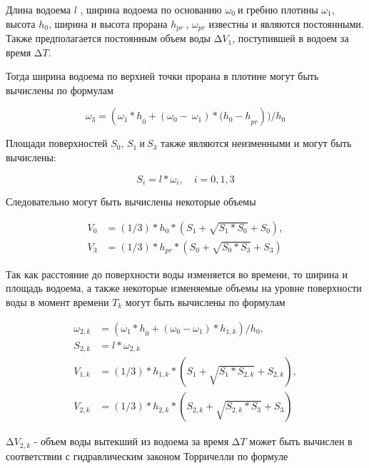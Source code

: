 \begin{multicols}{2}
Длина водоема \(l\) , ширина водоема по основанию \(\omega_{0}\ \)и
гребню плотины \(\omega_{1}\), высота \(h_{0}\), ширина и высота прорана
\(h_{pr}\ \), \(\omega_{pr}\) известны и являются постоянными. Также
предполагается постоянным объем воды \(\mathrm{\Delta}V_{1}\),
поступившей в водоем за время \(\mathrm{\Delta}T\).

Тогда ширина водоема по верхней точки прорана в плотине могут быть
вычислены по формулам

\begin{equation}
\omega_{3} = ({\omega_{1}*h}_{0} + \left( \omega_{0} - \ \omega_{1} \right)*{(h_{0} - h}_{pr}))/h_{0}
\end{equation}

Площади поверхностей \(S_{0}\), \(S_{1}\ и\ S_{3}\) также являются
неизменными и могут быть вычислены:

\begin{equation}
S_{i} = l*\omega_{i},\quad i = 0,1,3
\end{equation}

Следовательно могут быть вычислены некоторые объемы

\begin{equation}
\begin{aligned}
V_{0} &= (1/3)*h_{0}*\left( S_{1} + \sqrt{S_{1}*S_{0}} + S_{0} \right), \\
V_{3} &= (1/3)*h_{pr}*\left( S_{0} + \sqrt{S_{0}*S_{3}} + S_{3} \right)
\end{aligned}
\end{equation}

Так как расстояние до поверхности воды изменяется во времени, то ширина
и площадь водоема, а также некоторые изменяемые объемы на уровне
поверхности воды в момент времени \(T_{k}\) могут быть вычислены по
формулам

\begin{equation}
\begin{aligned}
\omega_{2,k} &= ({\omega_{1}*h}_{0} + \left( \omega_{0} - \omega_{1} \right)*h_{1,k})/h_{0}, \\
S_{2,k} &= l*\omega_{2,k} \\
V_{1,k} &= (1/3)*h_{1,k}*\left( S_{1} + \sqrt{S_{1}*S_{2,k}} + S_{2,k} \right), \\
V_{2,k} &= (1/3)*h_{2,k}*\left( S_{2,k} + \sqrt{S_{2,k}*S_{3}} + S_{3} \right)
\end{aligned}
\end{equation}

\(\mathrm{\Delta}V_{2,k}\) - объем воды вытекший из водоема за время
\(\mathrm{\Delta}T\) может быть вычислен в соответствии с гидравлическим
законом Торричелли по формуле


\end{multicols}
